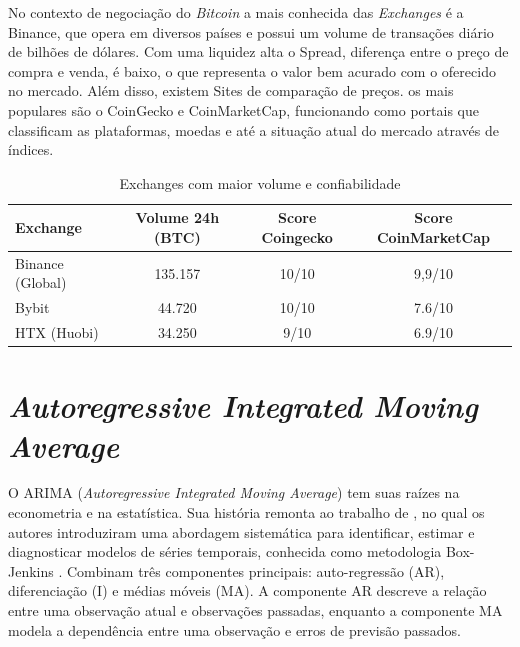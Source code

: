 No contexto de negociação do \textit{Bitcoin} a mais conhecida das \textit{Exchanges} é a Binance, que opera em diversos países e possui um volume de transações diário de bilhões de dólares.
Com uma liquidez alta o Spread, diferença entre o preço de compra e venda, é baixo, o que representa o valor bem acurado com o oferecido no mercado.
Além disso, existem Sites de comparação de preços. os mais populares são o CoinGecko e CoinMarketCap, funcionando
como portais que classificam as plataformas, moedas e até a situação atual do mercado através de índices.


\begin{table}[!htb]
  \caption{Exchanges com maior volume e confiabilidade} \label{tabela:lista_produtos}
  \begin{tabularx}{\textwidth}{l|c|c|c} \hline
    Exchange      & Volume 24h (BTC) & Score Coingecko & Score CoinMarketCap  \\ \hline
    Binance (Global)      & 135.157      & 10/10        & 9,9/10 \\
    Bybit         & 44.720      & 10/10        & 7.6/10  \\
    HTX (Huobi)       & 34.250     & 9/10        & 6.9/10  \\ \hline
  \end{tabularx}
\end{table}


\section{\textit{Autoregressive Integrated Moving Average}} \label{sec:arima}

O ARIMA (\textit{Autoregressive Integrated Moving Average}) tem suas raízes na econometria e na estatística.
Sua história remonta ao trabalho de \textcite{Box}, no qual os autores introduziram uma abordagem sistemática para identificar, estimar e diagnosticar modelos de séries temporais, conhecida como metodologia Box-Jenkins \cite{Arima}.
Combinam três componentes principais: auto-regressão (AR), diferenciação (I) e médias móveis (MA). A componente AR descreve a relação entre uma observação atual e observações passadas, enquanto a componente MA modela a dependência entre uma observação e erros de previsão passados. 

